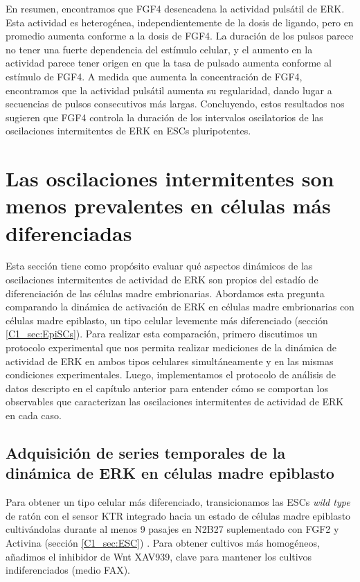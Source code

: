 \documentclass[./main.tex]{subfiles}
\begin{document}
En resumen, encontramos que FGF4 desencadena la actividad pulsátil de ERK. Esta actividad es heterogénea, independientemente de la dosis de ligando, pero en promedio aumenta conforme a la dosis de FGF4. La duración de los pulsos parece no tener una fuerte dependencia del estímulo celular, y el aumento en la actividad parece tener origen en que la tasa de pulsado aumenta conforme al estímulo de FGF4. A medida que aumenta la concentración de FGF4, encontramos que la actividad pulsátil aumenta su regularidad, dando lugar a secuencias de pulsos consecutivos más largas. Concluyendo, estos resultados nos sugieren que FGF4 controla la duración de los intervalos oscilatorios de las oscilaciones intermitentes de ERK en ESCs pluripotentes.


\section{Las oscilaciones intermitentes son menos prevalentes en células más diferenciadas}

Esta sección tiene como propósito evaluar qué aspectos dinámicos de las oscilaciones intermitentes de actividad de ERK son propios del estadío de diferenciación de las células madre embrionarias. Abordamos esta pregunta comparando la dinámica de activación de ERK en células madre embrionarias con células madre epiblasto, un tipo celular levemente más diferenciado (sección \ref{C1_sec:EpiSCs}). Para realizar esta comparación, primero discutimos un protocolo experimental que nos permita realizar mediciones de la dinámica de actividad de ERK en ambos tipos celulares simultáneamente y en las mismas condiciones experimentales. Luego, implementamos el protocolo de análisis de datos descripto en el capítulo anterior para entender cómo se comportan los observables que caracterizan las oscilaciones intermitentes de actividad de ERK en cada caso. 


\subsection{Adquisición de series temporales de la dinámica de ERK en células madre epiblasto}

Para obtener un tipo celular más diferenciado, transicionamos las ESCs \textit{wild type} de ratón con el sensor KTR integrado hacia un estado de células madre epiblasto cultivándolas durante al menos 9 pasajes en N2B27 suplementado con FGF2 y Activina (sección \ref{C1_sec:ESC}) \cite{Guo2009}. Para obtener cultivos más homogéneos, añadimos el inhibidor de Wnt XAV939, clave para mantener los cultivos indiferenciados (medio FAX).
\end{document}
